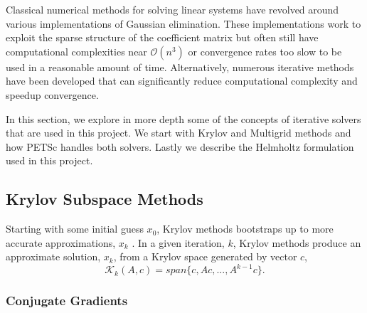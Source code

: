 \documentclass[]{article}
\theoremstyle{definition}
\begin{document}
Classical numerical methods for solving linear systems have revolved around various implementations of Gaussian elimination.  These implementations work to exploit the sparse structure of the coefficient matrix but often still have computational complexities near $\mathcal{O} (n^3)$ or convergence rates too slow to be used in a reasonable amount of time.  Alternatively, numerous iterative methods have been developed that can significantly reduce computational complexity and speedup convergence. 

In this section, we explore in more depth some of the concepts of iterative solvers that are used in this project.  We start with Krylov and Multigrid methods and how PETSc handles both solvers.  Lastly we describe the Helmholtz formulation used in this project.

\subsection{Krylov Subspace Methods}

Starting with some initial guess $x_0$, Krylov methods bootstraps up to more accurate approximations, $x_k$ \cite{Ispen1997}.  In a given iteration, $k$,  Krylov methods produce an approximate solution, $x_k$, from a Krylov space generated by vector $c$,
\begin{equation}
\mathcal{K}_k (A, c) = span \lbrace c, Ac, ..., A^{k-1} c \rbrace.
\end{equation}

\subsubsection{Conjugate Gradients}
\end{document}
